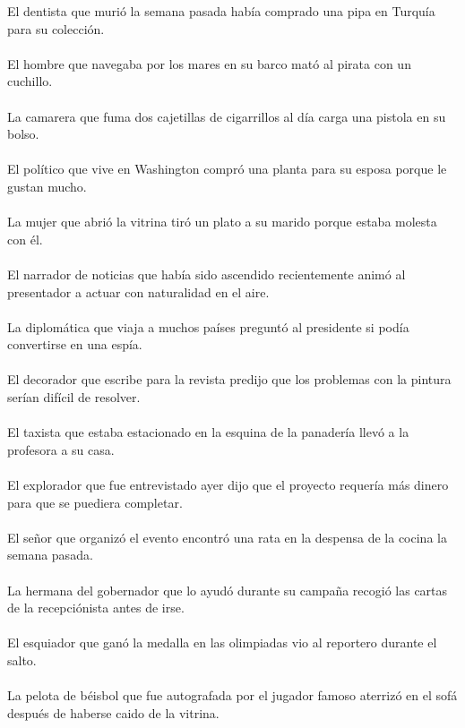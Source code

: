 El dentista que murió la semana pasada había comprado una pipa en Turquía para su colección.	\\	\\
El hombre que navegaba por los mares en su barco mató al pirata con un cuchillo.	\\	\\
La camarera que fuma dos cajetillas de cigarrillos al día carga una pistola en su bolso.	\\	\\
El político que vive en Washington compró una planta para su esposa porque le gustan mucho.	\\	\\
La mujer que abrió la vitrina tiró un plato a su marido porque estaba molesta con él.	\\	\\
El narrador de noticias que había sido ascendido recientemente animó al presentador a actuar con naturalidad en el aire.	\\	\\
La diplomática que viaja a muchos países preguntó al presidente si podía convertirse en una espía.	\\	\\
El decorador que escribe para la revista predijo que los problemas con la pintura serían difícil de resolver.	\\	\\
El  taxista que estaba estacionado en la esquina de la panadería  llevó a la profesora a su casa.	\\	\\
El explorador que fue entrevistado ayer dijo que el proyecto requería más dinero para que se puediera completar.	\\	\\
El señor que organizó el evento encontró una rata en la despensa de la cocina la semana pasada.	\\	\\
La hermana del gobernador que lo ayudó durante su campaña recogió las cartas de la recepciónista antes de irse.	\\	\\
El esquiador que ganó la medalla en las olimpiadas vio al reportero durante el salto.	\\	\\
La pelota de béisbol que fue autografada por el jugador famoso aterrizó en el sofá después de haberse caido de la vitrina.	\\	\\
